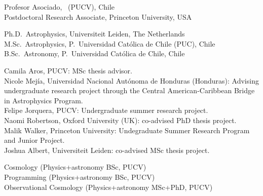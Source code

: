 \documentclass[11pt]{article}
\begin{document}

\noindent
{} Profesor Asociado, \pucv\ (PUCV), Chile\\
 Postdoctoral Research Associate, Princeton University, USA



\noindent
{} Ph.D.~Astrophysics, Universiteit Leiden, The Netherlands\\
 M.Sc.~Astrophysics, P.~Universidad Cat\'olica de Chile (PUC), Chile\\
 B.Sc.~Astronomy, P.~Universidad Cat\'olica de Chile, Chile\\







\noindent
{} Camila Aros, PUCV: MSc thesis advisor.\\
 Nicole Mej\'ia, Universidad Nacional Aut\'onoma de Honduras (Honduras): Advising undergraduate
    research project through the Central American-Caribbean Bridge in Astrophysics Program.\\
 Felipe Jorquera, PUCV: Undergraduate summer research project.\\
 Naomi Robertson, Oxford University (UK): co-advised PhD thesis project.\\
 Malik Walker, Princeton University: Undegraduate Summer Research Program and Junior Project.\\
 Joshua Albert, Universiteit Leiden: co-advised MSc thesis project. 



\noindent
{} Cosmology (Physics+astronomy BSc, PUCV)\\
 Programming (Physics+astronomy BSc, PUCV)\\
 Observational Cosmology (Physics+astronomy MSc+PhD, PUCV)\\
\end{document}
